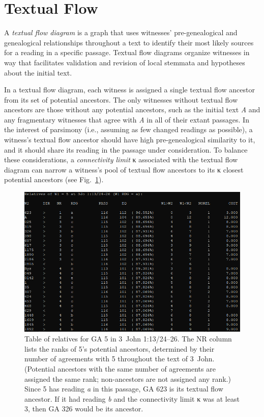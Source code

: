 \documentclass[a4paper, 12pt]{article}
\begin{document}
	\newpage
	
	\section{Textual Flow}\label{sec:textual-flow}
	A \emph{textual flow diagram} is a graph that uses witnesses' pre-genealogical and genealogical relationships throughout a text to identify their most likely sources for a reading in a specific passage. Textual flow diagrams organize witnesses in way that facilitates validation and revision of local stemmata and hypotheses about the initial text.
	
	In a textual flow diagram, each witness is assigned a single textual flow ancestor from its set of potential ancestors. The only witnesses without textual flow ancestors are those without any potential ancestors, such as the initial text \emph{A} and any fragmentary witnesses that agree with \emph{A} in all of their extant passages. In the interest of parsimony (i.e., assuming as few changed readings as possible), a witness's textual flow ancestor should have high pre-genealogical similarity to it, and it should share its reading in the passage under consideration. To balance these considerations, a \emph{connectivity limit} κ associated with the textual flow diagram can narrow a witness's pool of textual flow ancestors to its κ closest potential ancestors (see Fig.~\ref{fig:find-relatives}).
	
	\begin{figure}[h!]
		\centering
		\includegraphics[width=\textwidth]{../graphics/find-relatives.png}
		\caption{Table of relatives for GA 5 in 3~John 1:13/24–26. The \textsf{NR} column lists the ranks of 5's potential ancestors, determined by their number of agreements with 5 throughout the text of 3~John. (Potential ancestors with the same number of agreements are assigned the same rank; non-ancestors are not assigned any rank.) Since 5 has reading \emph{a} in this passage, GA 623 is its textual flow ancestor. If it had reading \emph{b} and the connectivity limit κ was at least 3, then GA 326 would be its ancestor.}
		\label{fig:find-relatives}
	\end{figure}
	
\end{document}
